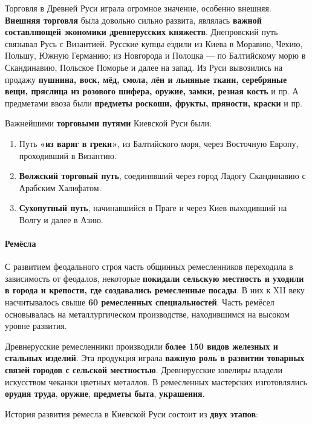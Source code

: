 \documentclass{article}
\begin{document}
Торговля в Древней Руси играла огромное значение, особенно внешняя. \textbf{Внешняя торговля} была довольно сильно развита, являлась \textbf{важной составляющей экономики древнерусских княжеств}. Днепровский путь связывал Русь с Византией. Русские купцы ездили из Киева в Моравию, Чехию, Польшу, Южную Германию; из Новгорода и Полоцка — по Балтийскому морю в Скандинавию, Польское Поморье и далее на запад. Из Руси вывозились на продажу \textbf{пушнина, воск, мёд, смола, лён и льняные ткани, серебряные вещи, пряслица из розового шифера, оружие, замки, резная кость} и пр. А предметами ввоза были \textbf{предметы роскоши, фрукты, пряности, краски} и пр.

Важнейшими \textbf{торговыми путями} Киевской Руси были: 

\begin{enumerate}
    \item Путь \textbf{«из варяг в греки»}, из Балтийского моря, через Восточную Европу, проходивший в Византию.
    \item \textbf{Волжский торговый путь}, соединявший через город Ладогу Скандинавию с Арабским Халифатом.
    \item \textbf{Сухопутный путь}, начинавшийся в Праге и через Киев выходивший на Волгу и далее в Азию.
\end{enumerate}

\paragraph{Ремёсла}

С развитием феодального строя часть общинных ремесленников переходила в зависимость от феодалов, некоторые \textbf{покидали сельскую местность и уходили в города и крепости, где создавались ремесленные посады}. В них к XII веку насчитывалось свыше \textbf{60 ремесленных специальностей}. Часть ремёсел основывалась на металлургическом производстве, находившимся на высоком уровне развития.

Древнерусские ремесленники производили \textbf{более 150 видов железных и стальных изделий}. Эта продукция играла \textbf{важную роль в развитии товарных связей городов с сельской местностью}. Древнерусские ювелиры владели искусством чеканки цветных металлов. В ремесленных мастерских изготовлялись \textbf{орудия труда}, \textbf{оружие}, \textbf{предметы быта}, \textbf{украшения}.

\hfill

История развития ремесла в Киевской Руси состоит из \textbf{двух этапов}:
\end{document}
